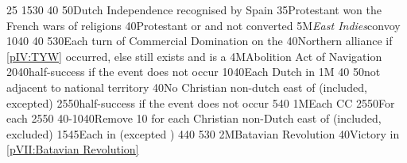 {}{25}{}%
%
%
{15}{30}{\EUobjIndependanceWars}%
%
 
%
%
{}{40}{}%
%
%
{}{50}{Dutch Independence recognised by Spain}%
%
%
{}{35}{Protestant won the French wars of religions}%
%
%
{}{40}{\paysmajeurAngleterre Protestant or \PROTANG and not converted}%
%
\EUobjective5M{\emph{East Indies}}{convoy}%
{10}{40}{\EUobjEastIndiesConvoy{\HOL}}%
%
%
%
{}{40}{}%
%
%
{5}{30}{Each turn of Commercial Domination on the }%
%
%
{}{40}{Northern \HRE alliance if \ref{pIV:TYW} occurred, else \payshanse still
  exists and is a \VASSAL}%
%
\EUobjective4M{Abolition Act of Navigation}{}%
{20}{40}{half-success if the event does not occur}%
%
%
{10}{40}{Each Dutch \COL in \continentBrazil}%
%
%
\EUobjective1M{}{}%
{}{40}{}%
%
%
{}{50}{\paysmajeurFrance not adjacent to \paysmajeurHollande national
  territory}%
%
%
{}{40}{No Christian non-dutch \TP east of \granderegionMalacca (included,
  \continentSiberia excepted)}%
%
%
{25}{50}{half-success if the event does not occur}%
%
%
{5}{40}{}%
%
%
\EUobjective1M{Each \CC}{CC}%
{25}{50}{For each }%
%
%
{25}{50}{\EUobjWoSS{\HOL}}%
%
%
{40-10}{40}{Remove 10 \VPs for each Christian non-Dutch \TP east of
   (included, \continentSiberia excluded)}%
%
%
{15}{45}{Each \COL in  (excepted )}%
%
%
{4}{40}{\EUobjEastIndiesConvoy{\HOL}}%
%
%
%
{5}{30}{\EUobjMonopolyZone}%
%
\EUobjective2M{Batavian Revolution}{}%
{}{40}{Victory in \ref{pVII:Batavian Revolution}}%
%
%
